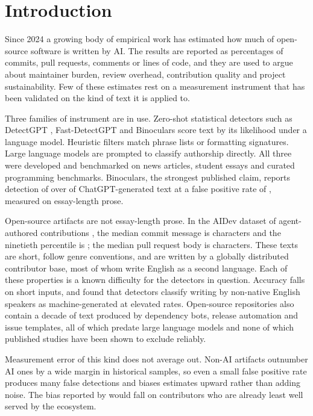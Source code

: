 \section{Introduction}
\label{sec:intro}

Since 2024 a growing body of empirical work has estimated how much of open-source
software is written by AI. The results are reported as percentages of commits, pull
requests, comments or lines of code, and they are used to argue about maintainer burden,
review overhead, contribution quality and project sustainability. Few of these estimates
rest on a measurement instrument that has been validated on the kind of text it is
applied to.

Three families of instrument are in use. Zero-shot statistical detectors such as
DetectGPT \citep{mitchell2023detectgpt}, Fast-DetectGPT \citep{bao2024fastdetectgpt} and
Binoculars \citep{hans2024binoculars} score text by its likelihood under a language
model. Heuristic filters match phrase lists or formatting signatures. Large language
models are prompted to classify authorship directly. All three were developed and
benchmarked on news articles, student essays and curated programming benchmarks.
Binoculars, the strongest published claim, reports detection of over  of
ChatGPT-generated text at a false positive rate of 
\citep{hans2024binoculars}, measured on essay-length prose.

Open-source artifacts are not essay-length prose. In the AIDev dataset of agent-authored
contributions \citep{li2025aidev}, the median commit message is
\AidevCommitMsgMedian{} characters and the ninetieth percentile is
\AidevCommitMsgPNinety{}; the median pull request body is \AidevBodyMedian{} characters.
These texts are short, follow genre conventions, and are written by a globally
distributed contributor base, most of whom write English as a second language. Each of
these properties is a known difficulty for the detectors in question. Accuracy falls on
short inputs, and \citet{liang2023biased} found that detectors classify writing by
non-native English speakers as machine-generated at elevated rates. Open-source
repositories also contain a decade of text produced by dependency bots, release
automation and issue templates, all of which predate large language models and none of
which published studies have been shown to exclude reliably.

Measurement error of this kind does not average out. Non-AI artifacts outnumber AI ones
by a wide margin in historical samples, so even a small false positive rate produces
many false detections and biases estimates upward rather than adding noise. The bias
reported by \citet{liang2023biased} would fall on contributors who are already least
well served by the ecosystem.

